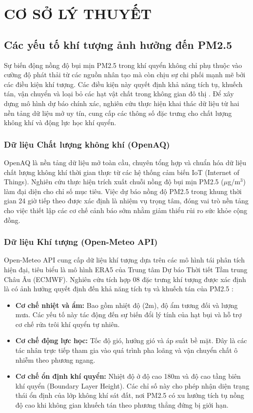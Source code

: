 \chapter{CƠ SỞ LÝ THUYẾT}
\section{Các yếu tố khí tượng ảnh hưởng đến PM2.5}
Sự biến động nồng độ bụi mịn PM2.5 trong khí quyển không chỉ phụ thuộc vào cường độ phát thải từ các nguồn nhân tạo mà còn chịu sự chi phối mạnh mẽ bởi các điều kiện khí tượng. Các điều kiện này quyết định khả năng tích tụ, khuếch tán, vận chuyển và loại bỏ các hạt vật chất trong không gian đô thị \cite{Jacob2009}. Để xây dựng mô hình dự báo chính xác, nghiên cứu thực hiện khai thác dữ liệu từ hai nền tảng dữ liệu mở uy tín, cung cấp các thông số đặc trưng cho chất lượng không khí và động lực học khí quyển.
    \subsection{Dữ liệu Chất lượng không khí (OpenAQ)}
    OpenAQ là nền tảng dữ liệu mở toàn cầu, chuyên tổng hợp và chuẩn hóa dữ liệu chất lượng không khí thời gian thực từ các hệ thống cảm biến IoT (Internet of Things). Nghiên cứu thực hiện trích xuất chuỗi nồng độ bụi mịn PM2.5 ($\mu$g/m$^3$) làm đại diện cho chỉ số mục tiêu. Việc dự báo nồng độ PM2.5 trong khung thời gian 24 giờ tiếp theo được xác định là nhiệm vụ trọng tâm, đóng vai trò nền tảng cho việc thiết lập các cơ chế cảnh báo sớm nhằm giảm thiểu rủi ro sức khỏe cộng đồng.
    \subsection{Dữ liệu Khí tượng (Open-Meteo API)}
    Open-Meteo API cung cấp dữ liệu khí tượng dựa trên các mô hình tái phân tích hiện đại, tiêu biểu là mô hình ERA5 của Trung tâm Dự báo Thời tiết Tầm trung Châu Âu (ECMWF). Nghiên cứu tích hợp 08 đặc trưng khí tượng được xác định là có ảnh hưởng quyết định đến khả năng tích tụ và khuếch tán của PM2.5 \cite{Tai2010}:
    \begin{itemize}
        \item \textbf{Cơ chế nhiệt và ẩm:} Bao gồm nhiệt độ (2m), độ ẩm tương đối và lượng mưa. Các yếu tố này tác động đến sự biến đổi lý tính của hạt bụi và hỗ trợ cơ chế rửa trôi khí quyển tự nhiên.
        \item \textbf{Cơ chế động lực học:} Tốc độ gió, hướng gió và áp suất bề mặt. Đây là các tác nhân trực tiếp tham gia vào quá trình pha loãng và vận chuyển chất ô nhiễm theo phương ngang.
        \item \textbf{Cơ chế ổn định khí quyển:} Nhiệt độ ở độ cao 180m và độ cao tầng biên khí quyển (Boundary Layer Height). Các chỉ số này cho phép nhận diện trạng thái ổn định của lớp không khí sát đất, nơi PM2.5 có xu hướng tích tụ nồng độ cao khi không gian khuếch tán theo phương thẳng đứng bị giới hạn.
    \end{itemize}

